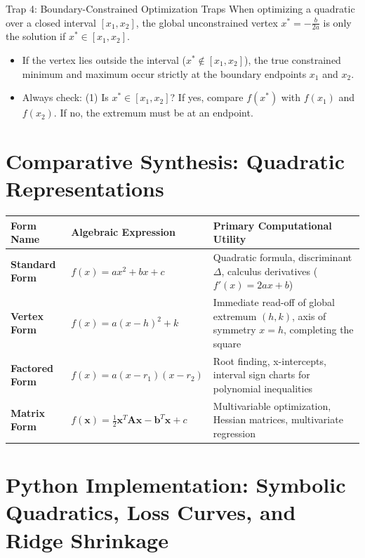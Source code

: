 \begin{trapbox}{Trap 4: Boundary-Constrained Optimization Traps}
When optimizing a quadratic over a closed interval $[x_1, x_2]$, the global unconstrained vertex $x^* = -\frac{b}{2a}$ is only the solution if $x^* \in [x_1, x_2]$.
\begin{itemize}
    \item If the vertex lies outside the interval ($x^* \notin [x_1, x_2]$), the true constrained minimum and maximum occur strictly at the boundary endpoints $x_1$ and $x_2$.
    \item Always check: (1) Is $x^* \in [x_1, x_2]$? If yes, compare $f(x^*)$ with $f(x_1)$ and $f(x_2)$. If no, the extremum must be at an endpoint.
\end{itemize}
\end{trapbox}

\section{Comparative Synthesis: Quadratic Representations}

\begin{center}
\renewcommand{\arraystretch}{1.3}
\begin{tabular}{p{3.2cm}p{4.0cm}p{4.2cm}}
\toprule
\textbf{Form Name} & \textbf{Algebraic Expression} & \textbf{Primary Computational Utility} \\
\midrule
\textbf{Standard Form} & $f(x) = ax^2 + bx + c$ & Quadratic formula, discriminant $\Delta$, calculus derivatives ($f'(x) = 2ax + b$) \\
\textbf{Vertex Form} & $f(x) = a(x - h)^2 + k$ & Immediate read-off of global extremum $(h, k)$, axis of symmetry $x = h$, completing the square \\
\textbf{Factored Form} & $f(x) = a(x - r_1)(x - r_2)$ & Root finding, x-intercepts, interval sign charts for polynomial inequalities \\
\textbf{Matrix Form} & $f(\mathbf{x}) = \frac{1}{2}\mathbf{x}^T \mathbf{A} \mathbf{x} - \mathbf{b}^T \mathbf{x} + c$ & Multivariable optimization, Hessian matrices, multivariate regression \\
\bottomrule
\end{tabular}
\end{center}

\section{Python Implementation: Symbolic Quadratics, Loss Curves, and Ridge Shrinkage}

